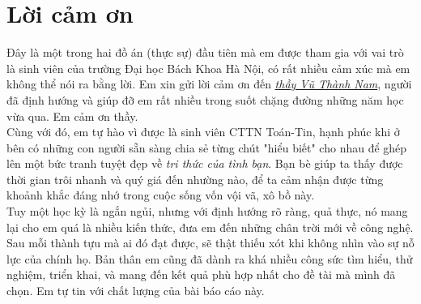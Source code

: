 \thispagestyle{empty} %
\section*{Lời cảm ơn}

Đây là một trong hai đồ án (thực sự) đầu tiên mà em được tham gia với vai trò là sinh viên của trường Đại học Bách Khoa Hà Nội, có rất nhiều cảm xúc mà em không thể nói ra bằng lời. Em xin gửi lời cảm ơn đến \href{mailto:}{\textit{thầy Vũ Thành Nam}}, người đã định hướng và giúp đỡ em rất nhiều trong suốt chặng đường những năm học vừa qua. Em cảm ơn thầy.\\

Cùng với đó, em tự hào vì được là sinh viên CTTN Toán-Tin, hạnh phúc khi ở bên có những con người sẵn sàng chia sẻ từng chút "hiểu biết" cho nhau để ghép lên một bức tranh tuyệt đẹp về \textit{tri thức của tình bạn}. Bạn bè giúp ta thấy được thời gian trôi nhanh và quý giá đến nhường nào, để ta cảm nhận được từng khoảnh khắc đáng nhớ trong cuộc sống vốn vội vã, xô bồ này.\\

Tuy một học kỳ là ngắn ngủi, nhưng với định hướng rõ ràng, quả thực, nó mang lại cho em quá là nhiều kiến thức, đưa em đến những chân trời mới về công nghệ. Sau mỗi thành tựu mà ai đó đạt được, sẽ thật thiếu xót khi không nhìn vào sự nỗ lực của chính họ. Bản thân em cũng đã dành ra khá nhiều công sức tìm hiểu, thử nghiệm, triển khai, và mang đến kết quả phù hợp nhất cho đề tài mà mình đã chọn. Em tự tin với chất lượng của bài báo cáo này.\\